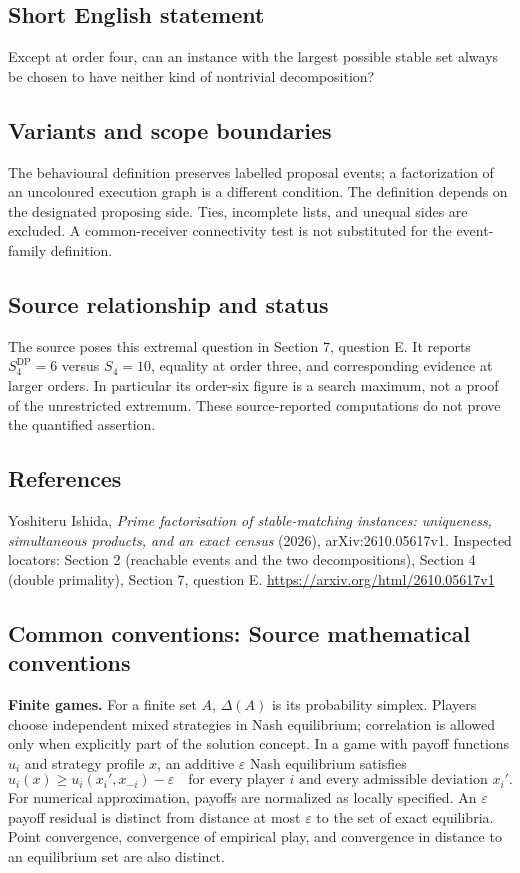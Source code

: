 \documentclass[11pt,a4paper]{article}
\begin{document}
\subsection*{Short English statement}
Except at order four, can an instance with the largest possible stable set always be chosen to have neither kind of nontrivial decomposition?

\subsection*{Variants and scope boundaries}
The behavioural definition preserves labelled proposal events; a factorization of an uncoloured execution graph is a different condition. The definition depends on the designated proposing side. Ties, incomplete lists, and unequal sides are excluded. A common-receiver connectivity test is not substituted for the event-family definition.

\subsection*{Source relationship and status}
The source poses this extremal question in Section 7, question E. It reports $S_4^{\mathrm{DP}}=6$ versus $S_4=10$, equality at order three, and corresponding evidence at larger orders. In particular its order-six figure is a search maximum, not a proof of the unrestricted extremum. These source-reported computations do not prove the quantified assertion.

\subsection*{References}
\begingroup\footnotesize\raggedright
\noindent [S1] Yoshiteru Ishida, \emph{Prime factorisation of stable-matching instances: uniqueness, simultaneous products, and an exact census} (2026), arXiv:2610.05617v1. Inspected locators: Section 2 (reachable events and the two decompositions), Section 4 (double primality), Section 7, question E.
\url{https://arxiv.org/html/2610.05617v1}
\par\endgroup

\subsection*{Common conventions: Source mathematical conventions}

\textbf{Finite games.} For a finite set $A$, $\Delta(A)$ is its probability
simplex. Players choose independent mixed strategies in Nash equilibrium;
correlation is allowed only when explicitly part of the solution concept.
In a game with payoff functions $u_i$ and strategy profile $x$, an additive
$\varepsilon$ Nash equilibrium satisfies
\[
 u_i(x)\geq u_i(x_i',x_{-i})-\varepsilon
 \quad\text{for every player $i$ and every admissible deviation $x_i'$}.
\]
For numerical approximation, payoffs are normalized as locally specified.
An $\varepsilon$ payoff residual is distinct from distance at most
$\varepsilon$ to the set of exact equilibria. Point convergence, convergence
of empirical play, and convergence in distance to an equilibrium set are
also distinct.
\end{document}
